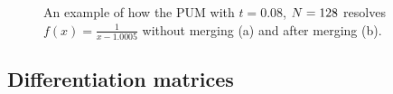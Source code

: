 \begin{figure}[!htb]
\centering
{}
\caption{An example of how the PUM with $t=0.08$, $N=128$ resolves $f(x)=\frac{1}{x-1.0005}$ without merging (a) and after merging (b).
}
\label{MERGE_EXAMPLE}
\end{figure}

\subsection{Differentiation matrices}
\label{PUM_matrix}

